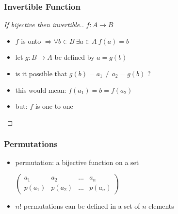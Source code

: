 \documentclass[dvipsnames]{beamer}
\begin{document}
\begin{frame}
  \frametitle{Invertible Function}

  \begin{proof}[If bijective then invertible.]
    $f: A \rightarrow B$
    \begin{itemize}
      \item $f$ is onto $\Rightarrow \forall b \in B~\exists a \in A~f(a)=b$
      \item let $g: B \rightarrow A$ be defined by $a=g(b)$

      \pause
      \medskip
      \item is it possible that $g(b) = a_1 \neq a_2 = g(b)$ ?

      \pause
      \item this would mean: $f(a_1) = b = f(a_2)$

      \pause
      \item but: $f$ is one-to-one
    \end{itemize}
  \end{proof}
\end{frame}

\begin{frame}
  \frametitle{Permutations}

  \begin{itemize}
    \item permutation: a bijective function on a set

    \medskip
    $\left(
      \begin{array}{cccc}
       a_1   &  a_2   & \dots &  a_n\\
      p(a_1) & p(a_2) & \dots & p(a_n)
      \end{array}
    \right)$

    \pause
    \medskip
    \item $n!$ permutations can be defined in a set of $n$ elements
  \end{itemize}
\end{frame}
\end{document}

